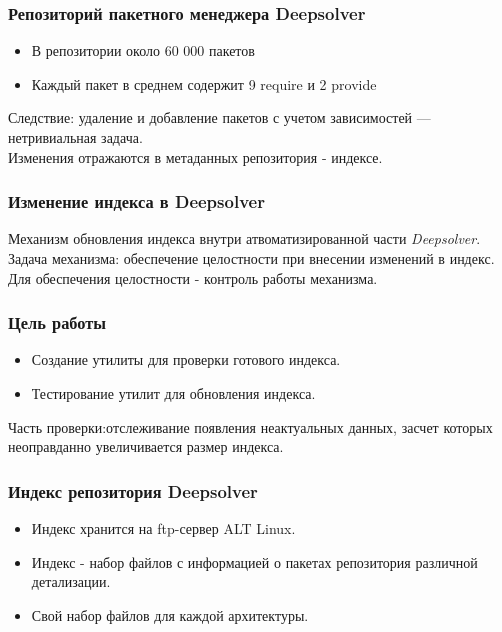 \documentclass{beamer}
\begin{document}
\begin{frame}
\frametitle{Репозиторий пакетного менеджера Deepsolver}
\begin{itemize}
\item
В репозитории около 60 000 пакетов
\item
Каждый пакет в среднем содержит 9 require и 2 provide
\end{itemize}

Следствие: удаление и добавление пакетов с учетом зависимостей ---
нетривиальная задача.\\

Изменения отражаются в метаданных репозитория - индексе.
\end{frame}

\begin{frame}
\frametitle{Изменение индекса в Deepsolver}
Механизм обновления индекса внутри атвоматизированной части  \textit{Deepsolver}.\\

Задача механизма: обеспечение целостности при внесении изменений в индекс.\\

Для обеспечения целостности - контроль работы механизма.

\end{frame}

\begin{frame}
\frametitle{Цель работы}
\begin{itemize}
\item
Создание утилиты для проверки готового индекса.
\item
Тестирование утилит для обновления индекса.
\end{itemize}

Часть проверки:отслеживание появления
неактуальных данных, засчет которых неоправданно увеличивается размер индекса.
\end{frame}

\begin{frame}
\frametitle{Индекс репозитория Deepsolver}
\begin{itemize}
\item
Индекс хранится на ftp-сервер ALT Linux.
\item
Индекс - набор файлов с информацией о пакетах репозитория различной детализации.
\item
Свой набор файлов для каждой архитектуры.
\end{itemize}
\end{frame}
\end{document}
